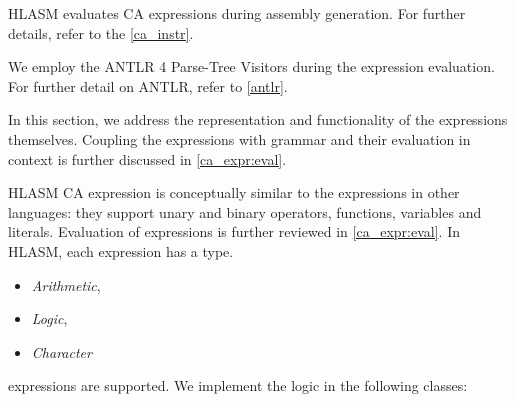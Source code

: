 HLASM evaluates CA expressions during assembly generation. For further details, refer to the \cref{ca_instr}.

We employ the ANTLR 4 Parse-Tree Visitors during the expression evaluation. For further detail on ANTLR, refer to \cref{antlr}.

In this section, we address the representation and functionality of the expressions themselves. Coupling the expressions with grammar and their evaluation in context is further discussed in \cref{ca_expr:eval}.

HLASM CA expression is conceptually similar to the expressions in other languages: they support unary and binary operators, functions, variables and literals. Evaluation of expressions is further reviewed in \cref{ca_expr:eval}. In HLASM, each expression has a type.

\begin{itemize}
	\item  \emph{Arithmetic},
	\item  \emph{Logic},
	\item  \emph{Character}
\end{itemize}
expressions are supported. We implement the logic in the following classes:

